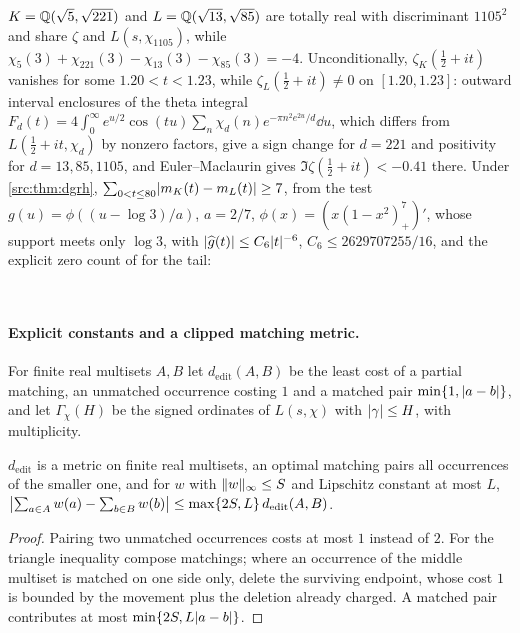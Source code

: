 \begin{example}\label{rec:ex:biquad}
$K=\mathbb{Q}(\sqrt5,\sqrt{221})$ and $L=\mathbb{Q}(\sqrt{13},\sqrt{85})$ are totally real with discriminant $1105^2$
and share $\zeta$ and $L(s,\chi_{1105})$, while
$\chi_5(3)+\chi_{221}(3)-\chi_{13}(3)-\chi_{85}(3)=-4$. Unconditionally, $\zeta_K(\tfrac12+it)$ vanishes for some
$1.20<t<1.23$, while $\zeta_L(\tfrac12+it)\ne0$ on $[1.20,1.23]$: outward interval enclosures of the
theta integral $F_d(t)=4\int_0^\infty e^{u/2}\cos(tu)\sum_n\chi_d(n)e^{-\pi n^2e^{2u}/d}\dd u$, which differs from
$L(\tfrac12+it,\chi_d)$ by nonzero factors, give a sign change for $d=221$ and positivity for
$d=13,85,1105$, and Euler--Maclaurin gives $\Im\zeta(\tfrac12+it)<-0.41$ there. Under \cref{src:thm:dgrh},
$\sum_{0<t\le80}\lvert m_K(t)-m_L(t)\rvert\ge7$, from the test $g(u)=\phi((u-\log3)/a)$, $a=2/7$,
$\phi(x)=(x(1-x^2)_+^7)'$, whose support meets only $\log3$, with $\lvert\widehat g(t)\rvert\le C_6\lvert t\rvert^{-6}$,
$C_6\le2629707255/16$, and the explicit zero count of
\cite[Corollary~1.2]{BennettMartinOBryantRechnitzer2021Counting} for the tail:
\begin{center}
\\
\end{center}
\end{example}

\paragraph{Explicit constants and a clipped matching metric.}
For finite real multisets $A,B$ let $d_{\mathrm{edit}}(A,B)$ be the least cost of a partial matching, an
unmatched occurrence costing $1$ and a matched pair $\min\{1,\lvert a-b\rvert\}$, and let $\Gamma_\chi(H)$ be the
signed ordinates of $L(s,\chi)$ with $\lvert\gamma\rvert\le H$, with multiplicity.

\begin{lemma}\label{rec:lem:edit}
$d_{\mathrm{edit}}$ is a metric on finite real multisets, an optimal matching pairs all occurrences of the
smaller one, and for $w$ with $\lVert w\rVert_\infty\le S$ and Lipschitz constant at most $L$,
$\bigl\lvert\sum_{a\in A}w(a)-\sum_{b\in B}w(b)\bigr\rvert\le\max\{2S,L\}\,d_{\mathrm{edit}}(A,B)$.
\end{lemma}

\begin{proof}
Pairing two unmatched occurrences costs at most $1$ instead of $2$. For the triangle inequality
compose matchings; where an occurrence of the middle multiset is matched on one side only, delete
the surviving endpoint, whose cost $1$ is bounded by the movement plus the deletion already
charged. A matched pair contributes at most $\min\{2S,L\lvert a-b\rvert\}$.
\end{proof}


